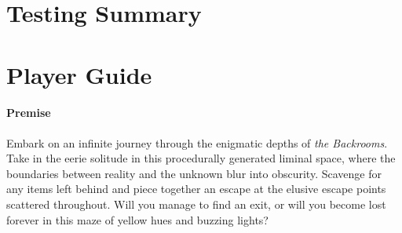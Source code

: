 \appendix
\chapter{Testing Summary}

\chapter{Player Guide}
\subsubsection{Premise}

Embark on an infinite journey through the enigmatic depths of \textit{the Backrooms}. Take in the eerie solitude in this procedurally generated liminal space, where the boundaries between reality and the unknown blur into obscurity. Scavenge for any items left behind and piece together an escape at the elusive escape points scattered throughout. Will you manage to find an exit, or will you become lost forever in this maze of yellow hues and buzzing lights?




